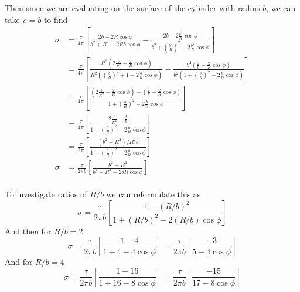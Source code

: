 \documentclass{article}
\begin{document}
Then since we are evaluating on the surface of the cylinder with radius $b$, we can take $\rho=b$ to find
\begin{align*}
\sigma &= \frac{\tau}{4\pi} \left[ \frac{ 2b - 2R\cos\phi }{b^{2} + R^{2} - 2Rb\cos\phi} - \frac{2b - 2\frac{b^{2}}{R}\cos\phi}{b^{2} + \left(\frac{b^{2}}{R}\right)^{2} - 2\frac{b^{3}}{R}\cos\phi} \right]\\
&= \frac{\tau}{4\pi} \left[ \frac{R^{2}( 2\frac{b}{R^{2}} - \frac{2}{R}\cos\phi )}{ R^{2}(\left(\frac{b}{R}\right)^{2} + 1 - 2\frac{b}{R}\cos\phi )} - \frac{b^{2}(\frac{2}{b} - \frac{2}{R}\cos\phi)}{b^{2}( 1 + \left(\frac{b}{R}\right)^{2} - 2\frac{b}{R}\cos\phi)} \right]\\
&= \frac{\tau}{4\pi} \left[ \frac{( 2\frac{b}{R^{2}} - \frac{2}{R}\cos\phi ) - ( \frac{2}{b} - \frac{2}{R}\cos\phi )}{ 1 + \left(\frac{b}{R}\right)^{2} - 2\frac{b}{R}\cos\phi} \right]\\
&= \frac{\tau}{4\pi} \left[ \frac{ 2\frac{b}{R^{2}} - \frac{2}{b} }{ 1 + \left(\frac{b}{R}\right)^{2} - 2\frac{b}{R}\cos\phi} \right]\\
&= \frac{\tau}{2\pi} \left[ \frac{ ( b^{2} - R^{2} )/R^{2}b }{ 1 + \left(\frac{b}{R}\right)^{2} - 2\frac{b}{R}\cos\phi} \right]\\
\sigma &= \boxed{\frac{\tau}{2\pi b} \left[ \frac{ b^{2} - R^{2} }{ b^{2} + R^{2} - 2bR\cos\phi} \right]}\\
\end{align*}

To investigate ratios of $R/b$ we can reformulate this as
\[ \sigma = \frac{\tau}{2\pi b} \left[ \frac{ 1 - (R/b)^{2} }{ 1 + (R/b)^{2} - 2(R/b)\cos\phi} \right] \]
And then for $R/b=2$
\[ \sigma = \frac{\tau}{2\pi b} \left[ \frac{ 1 - 4 }{ 1 + 4 - 4\cos\phi} \right] = \boxed{\frac{\tau}{2\pi b} \left[ \frac{ -3 }{ 5 - 4\cos\phi} \right]} \]
And for $R/b=4$
\[ \sigma = \frac{\tau}{2\pi b} \left[ \frac{ 1 - 16 }{ 1 + 16 - 8\cos\phi} \right] = \boxed{\frac{\tau}{2\pi b} \left[ \frac{ -15 }{ 17 - 8\cos\phi} \right]} \]
\end{document}
